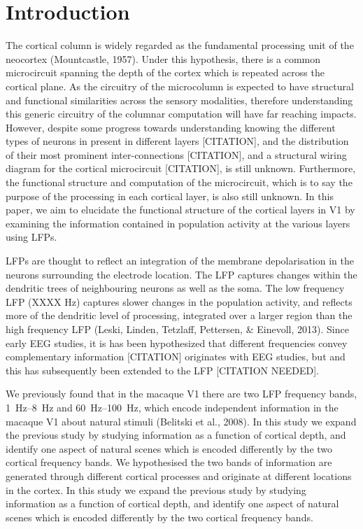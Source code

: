 \section{Introduction}
The cortical column is widely regarded as the fundamental processing unit of the neocortex (Mountcastle, 1957).
Under this hypothesis, there is a common microcircuit spanning the depth of the cortex which is repeated across the cortical plane.
As the circuitry of the microcolumn is expected to have structural and functional similarities across the sensory modalities, therefore understanding this generic circuitry of the columnar computation will have far reaching impacts.
However, despite some progress towards understanding knowing the different types of neurons in present in different layers [CITATION], and the distribution of their most prominent inter-connections [CITATION], and a structural wiring diagram for the cortical microcircuit [CITATION], is still unknown.
Furthermore, the functional structure and computation of the microcircuit, which is to say the purpose of the processing in each cortical layer, is also still unknown.
In this paper, we aim to elucidate the functional structure of the cortical layers in \ac{V1} by examining the information contained in population activity at the various layers using \acp{LFP}.

\acp{LFP} are thought to reflect an integration of the membrane depolarisation in the neurons surrounding the electrode location.
The \ac{LFP} captures changes within the dendritic trees of neighbouring neurons as well as the soma.
The low frequency \ac{LFP} (XXXX \si{Hz}) captures slower changes in the population activity, and reflects more of the dendritic level of processing, integrated over a larger region than the high frequency \ac{LFP} (Leski, Linden, Tetzlaff, Pettersen, \& Einevoll, 2013).
Since early \ac{EEG} studies, it is has been hypothesized that different frequencies convey complementary information [CITATION] originates with \ac{EEG} studies, but and this has subsequently been extended to the \ac{LFP} [CITATION NEEDED].


We previously found that in the macaque \ac{V1} there are two \ac{LFP} frequency bands, \SIrange{1}{8}{Hz} and \SIrange{60}{100}{Hz}, which encode independent information in the macaque \ac{V1} about natural stimuli (Belitski et al., 2008).
In this study we expand the previous study by studying information as a function of cortical depth, and identify one aspect of natural scenes which is encoded differently by the two cortical frequency bands.
We hypothesised the two bands of information are generated through different cortical processes and originate at different locations in the cortex.
In this study we expand the previous study by studying information as a function of cortical depth, and identify one aspect of natural scenes which is encoded differently by the two cortical frequency bands.

